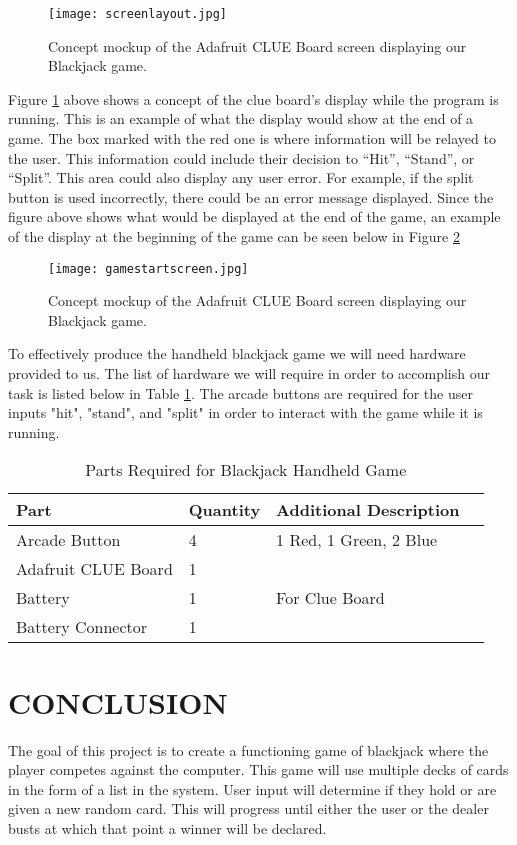 \documentclass[12pt]{article}
\begin{document}
\begin{figure}[ht]
  \centering
  \texttt{[image: screenlayout.jpg]}
  \caption{Concept mockup of the Adafruit CLUE Board screen displaying our Blackjack game.}
  \label{fig:blackjack1}
  \end{figure}
  
Figure \ref{fig:blackjack1} above shows a concept of the clue board’s display while the program is running. This is an example of what the display would show at the end of a game. The box marked with the red one is where information will be relayed to the user. This information could include their decision to “Hit”, “Stand”, or “Split”. This area could also display any user error. For example, if the split button is used incorrectly, there could be an error message displayed. Since the figure above shows what would be displayed at the end of the game, an example of the display at the beginning of the game can be seen below in Figure \ref{fig:blackjack2}
\begin{figure}[ht]
  \centering
  \texttt{[image: gamestartscreen.jpg]}
  \caption{Concept mockup of the Adafruit CLUE Board screen displaying our Blackjack game.}
  \label{fig:blackjack2}
  \end{figure}
  

To effectively produce the handheld blackjack game we will need hardware provided to us. The list of hardware we will require in order to accomplish our task is listed below in Table \ref{table:parts_list}. The arcade buttons are required for the user inputs "hit", "stand", and "split" in order to interact with the game while it is running.

\begin{table}[ht]
\centering
\begin{tabular}{|l|l|l|l|}
    \hline
    \textbf{Part} & \textbf{Quantity} & \textbf{Additional Description} \\ \hline
    Arcade Button & 4 & 1 Red, 1 Green, 2 Blue \\ \hline
    Adafruit CLUE Board & 1 &  \\ \hline
    Battery & 1 & For Clue Board \\ \hline
    Battery Connector & 1 &  \\ \hline
\end{tabular}
\caption{Parts Required for Blackjack Handheld Game}
\label{table:parts_list}
\end{table}

\section{CONCLUSION}
The goal of this project is to create a functioning game of blackjack where the player competes against the computer. This game will use multiple decks of cards in the form of a list in the system. User input will determine if they hold or are given a new random card. This will progress until either the user or the dealer busts at which that point a winner will be declared. 
\end{document}
